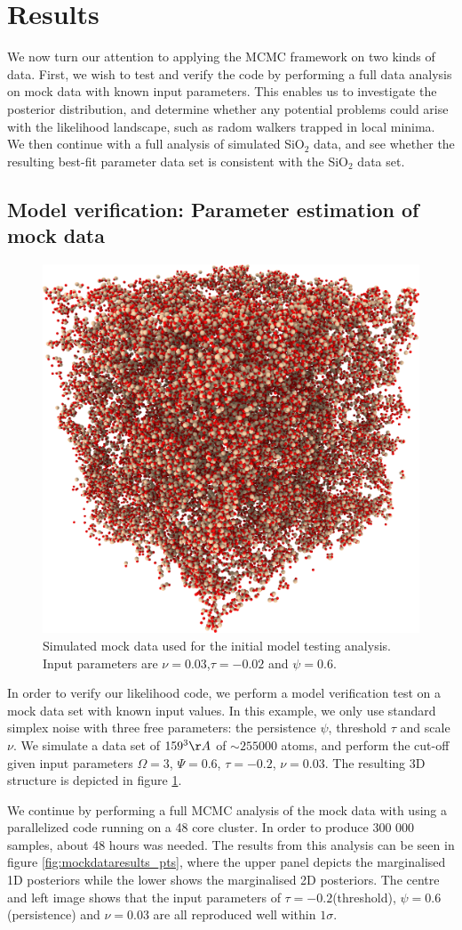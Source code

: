 \documentclass[aps,pre,twocolumn,letterpaper,floatfix,showpacs]{revtex4}
\begin{document}
\section{Results}
We now turn our attention to applying the MCMC framework on two kinds of data. First, we wish to test and verify the code by performing a full data analysis on mock data with known input parameters. This enables us to investigate the posterior distribution, and determine whether any potential problems could arise with the likelihood landscape, such as radom walkers trapped in local minima. We then continue with a full analysis of simulated SiO$_2$ data, and see whether the resulting best-fit parameter data set is consistent with the SiO$_2$ data set. 

\subsection{Model verification: Parameter estimation of mock data}
\begin{figure}[htb!]
\includegraphics[width=.45\textwidth]{model_test.png}
\caption{Simulated mock data used for the initial model testing analysis. Input parameters are $\nu=0.03$,$\tau=-0.02$ and $\psi=0.6$.}
\label{fig:mockdata}
\end{figure}
In order to verify our likelihood code, we perform a model verification test on a mock data set with known input values. In this example, we only use standard simplex noise with three free parameters: the persistence $\psi$, threshold $\tau$ and scale $\nu$. We simulate a data set of $159 ^3 \AA$ of $\sim 255 000$ atoms, and perform the cut-off given input parameters $\Omega=3$, $\Psi = 0.6$, $\tau=-0.2$, $\nu=0.03$. The resulting 3D structure is depicted in figure \ref{fig:mockdata}. 

We continue by performing a full MCMC analysis of the mock data with using a parallelized code running on a 48 core cluster. In order to produce 300 000 samples, about 48 hours was needed. The results from this analysis can be seen in figure \ref{fig:mockdataresults_pts}, where the upper panel depicts the marginalised 1D posteriors while the lower shows the marginalised 2D posteriors. The centre and left image shows that the input parameters of $\tau=-0.2$(threshold), $\psi=0.6$(persistence) and $\nu=0.03$ are all reproduced well within $1 \sigma$.
\end{document}
